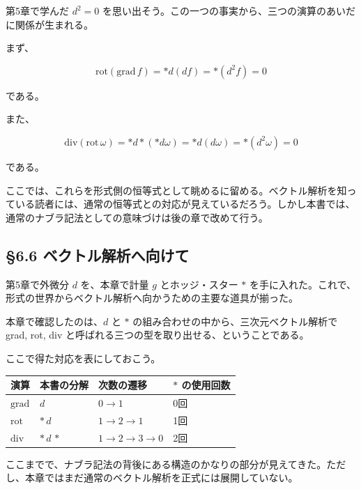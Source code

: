 \documentclass[a4paper,12pt,openany]{book}
\begin{document}
第5章で学んだ \(d^2 = 0\)
を思い出そう。この一つの事実から、三つの演算のあいだに関係が生まれる。

まず、

\[
\mathrm{rot}(\mathrm{grad}\,f)
=
\ast d(df)
=
\ast(d^2 f)
=
0
\]

である。

また、

\[
\mathrm{div}(\mathrm{rot}\,\omega)
=
\ast d\ast(\ast d\omega)
=
\ast d(d\omega)
=
\ast(d^2\omega)
=
0
\]

である。

ここでは、これらを形式側の恒等式として眺めるに留める。ベクトル解析を知っている読者には、通常の恒等式との対応が見えているだろう。しかし本書では、通常のナブラ記法としての意味づけは後の章で改めて行う。

\par\vspace{0.35em}\par

\hypertarget{ux30d9ux30afux30c8ux30ebux89e3ux6790ux3078ux5411ux3051ux3066}{%
\subsection{§6.6
ベクトル解析へ向けて}\label{ux30d9ux30afux30c8ux30ebux89e3ux6790ux3078ux5411ux3051ux3066}}

第5章で外微分 \(d\) を、本章で計量 \(g\) とホッジ・スター \(\ast\)
を手に入れた。これで、形式の世界からベクトル解析へ向かうための主要な道具が揃った。

本章で確認したのは、\(d\) と \(\ast\)
の組み合わせの中から、三次元ベクトル解析で grad, rot, div
と呼ばれる三つの型を取り出せる、ということである。

ここで得た対応を表にしておこう。

\begin{longtable}[]{@{}llll@{}}
\toprule\noalign{}
演算 & 本書の分解 & 次数の遷移 & \(\ast\) の使用回数 \\
\midrule\noalign{}
\endhead
\bottomrule\noalign{}
\endlastfoot
\(\mathrm{grad}\) & \(d\) & \(0 \to 1\) & 0回 \\
\(\mathrm{rot}\) & \(\ast\,d\) & \(1 \to 2 \to 1\) & 1回 \\
\(\mathrm{div}\) & \(\ast\,d\,\ast\) & \(1 \to 2 \to 3 \to 0\) & 2回 \\
\end{longtable}

ここまでで、ナブラ記法の背後にある構造のかなりの部分が見えてきた。ただし、本章ではまだ通常のベクトル解析を正式には展開していない。
\end{document}
